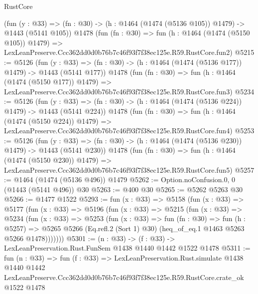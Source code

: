 \begin{lexlean}{RustCore}
\begin{coremodule}
    (fun (y : @33) => (fn : @30) -> (h : @1464 (@1474 (@5136 @105)) @1479) -> @1443 (@5141 @105))
    @1478
    (fun (fn : @30) =>
    fun (h : @1464 (@1474 (@5150 @105)) @1479) =>
    LexLeanPreserve.Ccc362dd0d0b76b7c46f93f7f38ec125e.R59.RustCore.fun2)
@5215 := @5126
    (fun (y : @33) => (fn : @30) -> (h : @1464 (@1474 (@5136 @177)) @1479) -> @1443 (@5141 @177))
    @1478
    (fun (fn : @30) =>
    fun (h : @1464 (@1474 (@5150 @177)) @1479) =>
    LexLeanPreserve.Ccc362dd0d0b76b7c46f93f7f38ec125e.R59.RustCore.fun3)
@5234 := @5126
    (fun (y : @33) => (fn : @30) -> (h : @1464 (@1474 (@5136 @224)) @1479) -> @1443 (@5141 @224))
    @1478
    (fun (fn : @30) =>
    fun (h : @1464 (@1474 (@5150 @224)) @1479) =>
    LexLeanPreserve.Ccc362dd0d0b76b7c46f93f7f38ec125e.R59.RustCore.fun4)
@5253 := @5126
    (fun (y : @33) => (fn : @30) -> (h : @1464 (@1474 (@5136 @230)) @1479) -> @1443 (@5141 @230))
    @1478
    (fun (fn : @30) =>
    fun (h : @1464 (@1474 (@5150 @230)) @1479) =>
    LexLeanPreserve.Ccc362dd0d0b76b7c46f93f7f38ec125e.R59.RustCore.fun5)
@5257 := @1464 (@1474 (@5136 @496)) @1479
@5262 := Option.noConfusion.{0, 0} (@1443 (@5141 @496)) @30
@5263 := @400 @30
@5265 := @5262 @5263 @30
@5266 := @1477 @1522
@5293 := fun (x : @33) =>
  @5158
    (fun (x : @33) =>
    @5177
      (fun (x : @33) =>
      @5196
        (fun (x : @33) =>
        @5215
          (fun (x : @33) =>
          @5234
            (fun (x : @33) =>
            @5253
              (fun (x : @33) =>
              fun (fn : @30) =>
              fun (h : @5257) =>
              @5265 @5266 (Eq.refl.{2} (Sort 1) @30) (heq_of_eq.{1} @1463 @5263 @5266 @1478)))))))
@5301 := (n : @33) -> (f : @33) -> LexLeanPreservation.Rust.FunSem @1438 @1440 @1442 @1522 @1478
@5311 := fun (n : @33) =>
  fun (f : @33) =>
  LexLeanPreservation.Rust.simulate
    @1438
    @1440
    @1442
    LexLeanPreserve.Ccc362dd0d0b76b7c46f93f7f38ec125e.R59.RustCore.crate_ok
    @1522
    @1478
\end{coremodule}
\end{lexlean}
